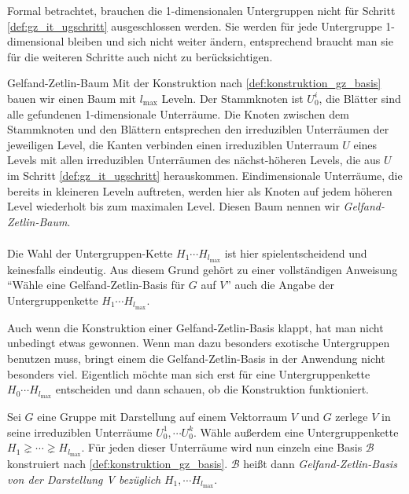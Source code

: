 \begin{remark}
	Formal betrachtet, brauchen die 1-dimensionalen Untergruppen nicht für Schritt \ref{def:gz_it_ugschritt} ausgeschlossen werden. Sie werden für jede Untergruppe 1-dimensional bleiben und sich nicht weiter ändern, entsprechend braucht man sie für die weiteren Schritte auch nicht zu berücksichtigen.
\end{remark}
\begin{definition}{Gelfand-Zetlin-Baum}
		Mit der Konstruktion nach \ref{def:konstruktion_gz_basis} bauen wir einen Baum mit $l_{\text{max}}$ Leveln. Der Stammknoten ist $U_0^i$, die Blätter sind alle gefundenen 1-dimensionale Unterräume. Die Knoten zwischen dem Stammknoten und den Blättern entsprechen den irreduziblen Unterräumen der jeweiligen Level, die Kanten verbinden einen irreduziblen Unterraum $U$ eines Levels mit allen irreduziblen Unterräumen des nächst-höheren Levels, die aus $U$ im Schritt \ref{def:gz_it_ugschritt} herauskommen. Eindimensionale Unterräume, die bereits in kleineren Leveln auftreten, werden hier als Knoten auf jedem höheren Level wiederholt bis zum maximalen Level.
		Diesen Baum nennen wir \emph{Gelfand-Zetlin-Baum}.
	\begin{align*}
	\end{align*}
	
\end{definition}
\begin{remark}
		Die Wahl der Untergruppen-Kette $H_1\cdots H_{l_{\text{max}}}$ ist hier spielentscheidend und keinesfalls eindeutig. Aus diesem Grund gehört zu einer vollständigen Anweisung \enquote{Wähle eine Gelfand-Zetlin-Basis für $G$ auf $V$} auch die Angabe der Untergruppenkette $H_1\cdots H_{l_{\text{max}}}$.
\end{remark}
\begin{remark}
	Auch wenn die Konstruktion einer Gelfand-Zetlin-Basis klappt, hat man nicht unbedingt etwas gewonnen. Wenn man dazu besonders exotische Untergruppen benutzen muss, bringt einem die Gelfand-Zetlin-Basis in der Anwendung nicht besonders viel. Eigentlich möchte man sich erst für eine Untergruppenkette $H_0\cdots H_{l_{\text{max}}}$ entscheiden und dann schauen, ob die Konstruktion funktioniert.
\end{remark}
\begin{definition}[$\Gae\jae\el\soft\fae\aaa\en\dae$-$\Zae\jae\tae\el\iii\en$-$\Bae\aaa\sae\aaa$]
	\label{def:gz_basis}
	Sei $G$ eine Gruppe mit Darstellung auf einem Vektorraum $V$ und $G$ zerlege $V$ in seine irreduziblen Unterräume $U^1_0,\cdots U^k_0$. Wähle außerdem eine Untergruppenkette $H_1 \gneq\cdots\gneq H_{l_{\text{max}}}$. Für jeden dieser Unterräume wird nun einzeln eine Basis $\mathcal{B}$ konstruiert nach \ref{def:konstruktion_gz_basis}. $\mathcal{B}$ heißt dann \emph{Gelfand-Zetlin-Basis von der Darstellung V bezüglich} $H_1,\cdots H_{l_{\text{max}}}$. 
\end{definition}

